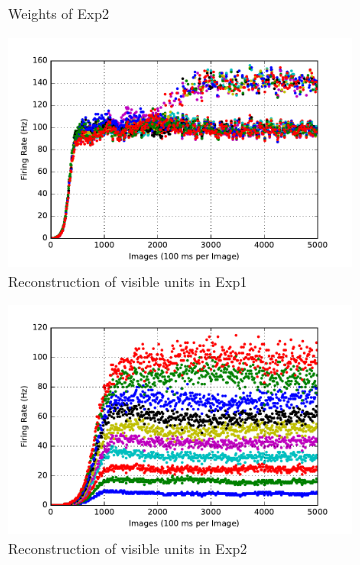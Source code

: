 \begin{figure}
\begin{subfigure}[t]{0.4\textwidth}
		\caption{Weights of Exp2}
	\end{subfigure}
	\begin{subfigure}[t]{0.4\textwidth}
		\includegraphics[width=\textwidth]{pics_sdlm/10_exp_SRBM_Orig/exp1_recon_s.pdf}
		\caption{Reconstruction of visible units in Exp1}
	\end{subfigure}
	\begin{subfigure}[t]{0.4\textwidth}
		\includegraphics[width=\textwidth]{pics_sdlm/10_exp_SRBM_Orig/exp2_recon_s.pdf}
		\caption{Reconstruction of visible units in Exp2}
	\end{subfigure}\\
	\begin{subfigure}[t]{0.4\textwidth}

\end{subfigure}
\end{figure}
